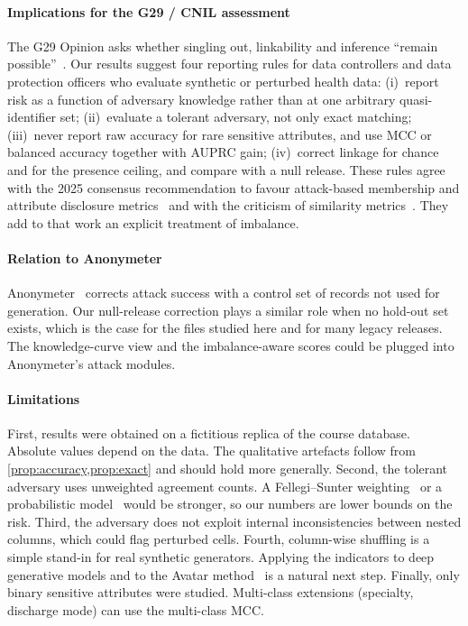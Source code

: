 \documentclass[preprint,12pt]{elsarticle}
\newcommand{\G}{G29}
\begin{document}
\paragraph{Implications for the \G{} / CNIL assessment}
The \G{} Opinion asks whether singling out, linkability and inference ``remain possible''~\cite{wp29_2014,cnil_g29}. Our results suggest four reporting rules for data controllers and data protection officers who evaluate synthetic or perturbed health data:
(i)~report risk as a function of adversary knowledge rather than at one arbitrary quasi-identifier set;
(ii)~evaluate a tolerant adversary, not only exact matching;
(iii)~never report raw accuracy for rare sensitive attributes, and use MCC or balanced accuracy together with AUPRC gain;
(iv)~correct linkage for chance and for the presence ceiling, and compare with a null release.
These rules agree with the 2025 consensus recommendation to favour attack-based membership and attribute disclosure metrics~\cite{pilgram2025consensus} and with the criticism of similarity metrics~\cite{ganev2025inadequacy,yao2025dcr}. They add to that work an explicit treatment of imbalance.

\paragraph{Relation to Anonymeter}
Anonymeter~\cite{giomi2023anonymeter} corrects attack success with a control set of records not used for generation. Our null-release correction plays a similar role when no hold-out set exists, which is the case for the files studied here and for many legacy releases. The knowledge-curve view and the imbalance-aware scores could be plugged into Anonymeter's attack modules.

\paragraph{Limitations}
First, results were obtained on a fictitious replica of the course database. Absolute values depend on the data. The qualitative artefacts follow from \cref{prop:accuracy,prop:exact} and should hold more generally. Second, the tolerant adversary uses unweighted agreement counts. A Fellegi--Sunter weighting~\cite{fellegi1969linkage} or a probabilistic model~\cite{rocher2019estimating} would be stronger, so our numbers are lower bounds on the risk. Third, the adversary does not exploit internal inconsistencies between nested columns, which could flag perturbed cells. Fourth, column-wise shuffling is a simple stand-in for real synthetic generators. Applying the indicators to deep generative models and to the Avatar method~\cite{guillaudeux2023avatar} is a natural next step. Finally, only binary sensitive attributes were studied. Multi-class extensions (specialty, discharge mode) can use the multi-class MCC.
\end{document}
